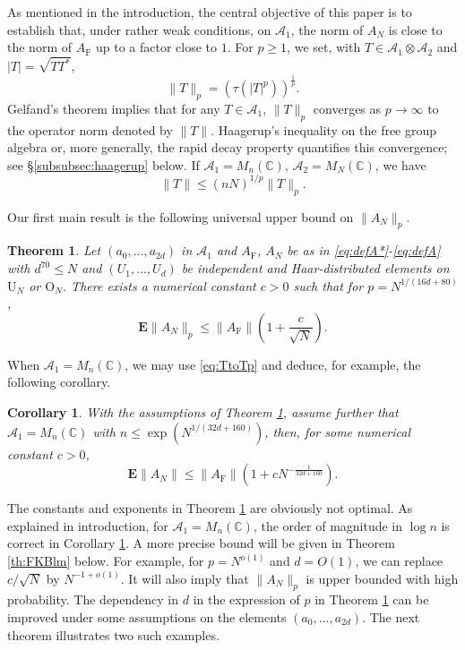 \documentclass[11pt]{article}
\renewcommand{\star}{{\mathrm{F}}}
\newtheorem{theorem}[lemma]{Theorem}
\newtheorem{corollary}[lemma]{Corollary}
\newcommand{\cA}{\mathcal{A}}
\newcommand{\dE}{\mathbf {E}}
\newcommand{\dU}{\mathrm {U}}
\newcommand{\dO}{\mathrm{O}}
\newcommand{\dC}{\mathbb {C}}
\newcommand{\PAR}[1]{{{\left(#1\right)}}} %
\newcommand{\1}{1\!\!{\sf I}}
\begin{document}
As mentioned in the introduction, the central objective of this paper is to establish that, under rather weak conditions, on $\cA_1$, the norm of $A_N$ is close to the norm of $A_\star$ up to a factor close to $1$.  For $p \geq 1$, we set, with $T \in \cA_1 \otimes \cA_2$ and $|T| = \sqrt{ T T^*}$,  
$$
\| T \|_p = \PAR{ \tau (|T|^{p} ) }^{\frac 1 {p}}.
$$
Gelfand's theorem implies that for any $T \in \cA_1$, $\| T \|_p$ converges  as $p \to \infty$ to the operator norm denoted by $\| T \|$. Haagerup's inequality on the free group algebra or, more generally, the rapid decay property quantifies this convergence; see \S \ref{subsubsec:haagerup} below. If $\cA_1 = M_n(\dC)$, $\cA_{2} = M_N(\dC)$, we have 
\begin{equation}\label{eq:TtoTp}
\| T \| \leq (nN)^{1/p} \| T \|_p.
\end{equation}

Our first main result is the following universal upper bound on $\| A_N \|_p$. 
\begin{theorem}
\label{th:main1}
Let $(a_0,\ldots,a_{2d})$ in $\cA_1$ and $A_\star$, $A_N$ be as in \eqref{eq:defA*}-\eqref{eq:defA} with $d^{70} \leq N$ and  $(U_1,\ldots, U_d)$ be independent and Haar-distributed elements on $\dU_N$ or $\dO_N$. There exists a numerical constant $c >0$ such that for  $p = N^{1/(16d + 80)}$,
$$
  \dE \|A_N \|_p  \leq   \| A_\star \| \PAR{ 1 + \frac{c}{ \sqrt N}}.
$$
\end{theorem}

When $\cA_1 = M_n(\dC)$, we may use \eqref{eq:TtoTp} and deduce, for example, the following corollary.
\begin{corollary}\label{cor:main1}
With the assumptions of Theorem \ref{th:main1}, assume further that $\cA_1 = M_n(\dC)$ with $n \leq \exp ( N^{1/(32d + 160)} )$, then, for some numerical constant $c >0$, 
$$
\dE \| A_N \|  \leq \| A_\star \| \PAR{ 1 + c N^{-\frac{1}{32 d + 160} }}.
$$
\end{corollary}


The constants and exponents in Theorem \ref{th:main1} are obviously not optimal. 
As explained in introduction, for $\cA_1 = M_n(\dC)$, the order of magnitude in $\log n$ is correct in Corollary \ref{cor:main1}.
A more precise bound will be given in Theorem \ref{th:FKBlm} below. For example, for $p = N^{o(1)}$ and $d = O(1)$, we can replace $c/\sqrt N$ by $N^{-1+o(1)}$. It will also imply that $\|A_N\|_p$ is upper bounded with high probability. The dependency in $d$ in the expression of $p$ in Theorem \ref{th:main1} can be improved under some assumptions on the elements $(a_0,\ldots,a_{2d})$. The next theorem illustrates two such examples.  
\end{document}
